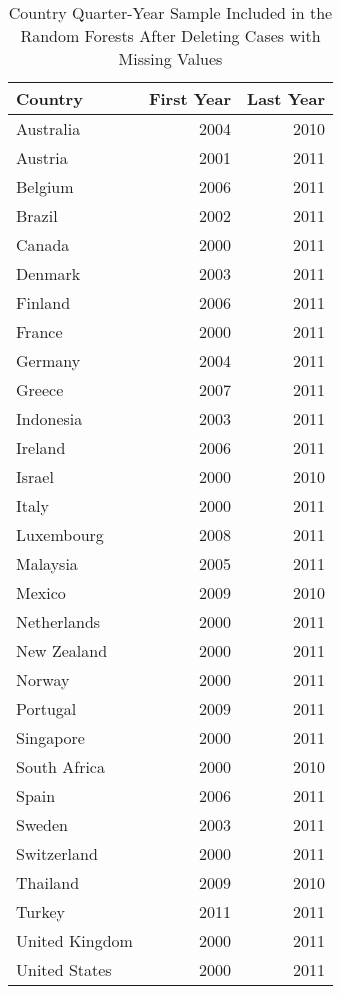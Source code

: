 \begin{table}[ht]
\centering
\caption{Country Quarter-Year Sample Included in the Random Forests After Deleting Cases with Missing Values} 
\begin{tabular}{lrr}
  \hline
Country & First Year & Last Year \\ 
  \hline
Australia & 2004 & 2010 \\ 
  Austria & 2001 & 2011 \\ 
  Belgium & 2006 & 2011 \\ 
  Brazil & 2002 & 2011 \\ 
  Canada & 2000 & 2011 \\ 
  Denmark & 2003 & 2011 \\ 
  Finland & 2006 & 2011 \\ 
  France & 2000 & 2011 \\ 
  Germany & 2004 & 2011 \\ 
  Greece & 2007 & 2011 \\ 
  Indonesia & 2003 & 2011 \\ 
  Ireland & 2006 & 2011 \\ 
  Israel & 2000 & 2010 \\ 
  Italy & 2000 & 2011 \\ 
  Luxembourg & 2008 & 2011 \\ 
  Malaysia & 2005 & 2011 \\ 
  Mexico & 2009 & 2010 \\ 
  Netherlands & 2000 & 2011 \\ 
  New Zealand & 2000 & 2011 \\ 
  Norway & 2000 & 2011 \\ 
  Portugal & 2009 & 2011 \\ 
  Singapore & 2000 & 2011 \\ 
  South Africa & 2000 & 2010 \\ 
  Spain & 2006 & 2011 \\ 
  Sweden & 2003 & 2011 \\ 
  Switzerland & 2000 & 2011 \\ 
  Thailand & 2009 & 2010 \\ 
  Turkey & 2011 & 2011 \\ 
  United Kingdom & 2000 & 2011 \\ 
  United States & 2000 & 2011 \\ 
   \hline
\end{tabular}
\end{table}
